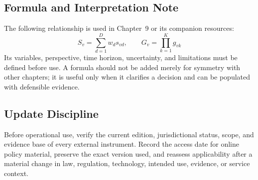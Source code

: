 \subsection{Formula and Interpretation Note}
The following relationship is used in Chapter~9 or its companion resources:
\begin{equation}
S_v=\sum_{d=1}^{D}w_ds_{vd},\qquad G_v=\prod_{k=1}^{K}g_{vk}
\label{eq:comp-ch09-reference-formula}
\end{equation}
Its variables, perspective, time horizon, uncertainty, and limitations must be
defined before use. A formula should not be added merely for symmetry with other
chapters; it is useful only when it clarifies a decision and can be populated with
defensible evidence.

\subsection{Update Discipline}
Before operational use, verify the current edition, jurisdictional status, scope,
and evidence base of every external instrument. Record the access date for online
policy material, preserve the exact version used, and reassess applicability after a
material change in law, regulation, technology, intended use, evidence, or service
context.
